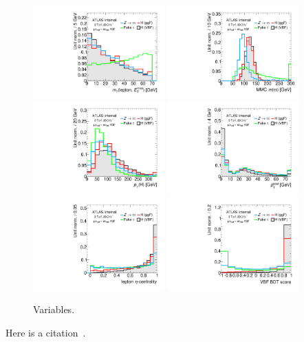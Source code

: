 \begin{figure}[tp]
  \centering
  \includegraphics[width=0.45\textwidth]{figures/overlaid/vbf/mT}
  \includegraphics[width=0.45\textwidth]{figures/overlaid/vbf/mMMC}
  \includegraphics[width=0.45\textwidth]{figures/overlaid/vbf/H-pt-hi}
  \includegraphics[width=0.45\textwidth]{figures/overlaid/vbf/system-pt}
  \includegraphics[width=0.45\textwidth]{figures/overlaid/vbf/lep-eta-centrality}
  \includegraphics[width=0.45\textwidth]{figures/overlaid/vbf/BDTEve-VBF}
  \caption{Variables.}
  \label{fig:strategy-overlaid-vbf-other}
\end{figure}

Here is a citation~\cite{1999.ATLAS.Physics-TDR}.


